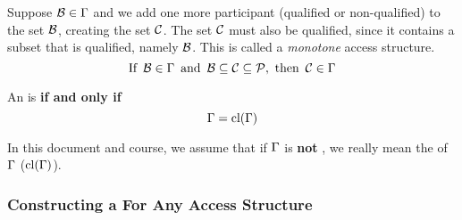 \begin{definition}[Monotone]\label{def:Monotone_Access_Structure}
  Suppose $\operatorname{\mathcal{B}} \in \operatorname{\Gamma}$ and we add one more participant (qualified or non-qualified) to the set $\operatorname{\mathcal{B}}$, creating the set $\operatorname{\mathcal{C}}$.
  The set $\operatorname{\mathcal{C}}$ must also be qualified, since it contains a subset that is qualified, namely $\operatorname{\mathcal{B}}$.
  This  is called a \emph{monotone} access structure.
  \begin{equation}\label{eq:Monotone_Access_Structure}
    \text{If } \operatorname{\mathcal{B}} \in \operatorname{\Gamma} \text{ and } \operatorname{\mathcal{B}} \subseteq \operatorname{\mathcal{C}} \subseteq \operatorname{\mathcal{P}}, \text{ then } \operatorname{\mathcal{C}} \in \operatorname{\Gamma}
  \end{equation}

  \begin{remark}\label{rmk:Monotone_Closure_Access_Structure}
    An  is  \textbf{if and only if}
    \begin{equation}\label{eq:Monotone_Closure_Access_Structure}
      \operatorname{\Gamma} = \operatorname{\text{cl}}(\operatorname{\Gamma})
    \end{equation}
  \end{remark}

  \begin{remark}
    In this document and course, we assume that if $\operatorname{\Gamma}$ is \textbf{not} , we really mean the  of $\operatorname{\Gamma}$ ($\operatorname{\text{cl}}(\operatorname{\Gamma})$).
  \end{remark}
\end{definition}

\subsubsection{Constructing a  For Any Access Structure}\label{subsubsec:Construct_Perfect_Secret_Sharing_Scheme}
